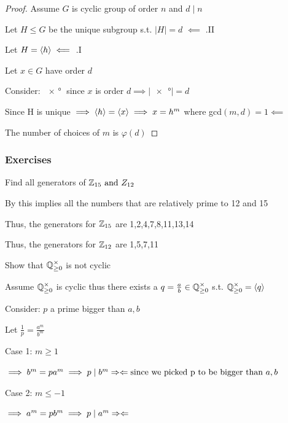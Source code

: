 
\begin{proof}
    Assume $G$ is cyclic group of order $n$ and $d\mid n$

    Let $H\leq G$ be the unique subgroup s.t. $|H|=d$
    $\impliedby$ .II

    Let $H=\left\langle h \right\rangle \impliedby$ .I

    Let $x\in G$ have order $d$
    
    Consider: $\ang{x}$ since $x$ is order $d \implies |\ang{x}|=d$

    Since H is unique $\implies \left\langle h \right\rangle=\left\langle x \right\rangle \implies x=h^m$ where gcd$(m,d)=1 \impliedby$ 

    The number of choices of $m$ is $\varphi(d)$
\end{proof}

\newpage
\subsubsection{Exercises}
\begin{example}
    Find all generators of $\mathbb{Z}_{15} \text{ and } Z_{12}$

    By  this implies all the numbers that are relatively prime to 12 and 15

    Thus, the generators for $\mathbb{Z}_{15}$ are 1,2,4,7,8,11,13,14

    Thus, the generators for $\mathbb{Z}_{12}$ are 1,5,7,11
    
\end{example}

\begin{example}
    Show that $\mathbb{Q}^\times_{\geq0}$ is not cyclic

    Assume $\mathbb{Q}^\times_{\geq0}$ is cyclic thus there exists
    a $q=\frac{a}{b}\in\mathbb{Q}^\times_{\geq0}$ s.t. $\mathbb{Q}^\times_{\geq0}=\left\langle q \right\rangle$

    Consider: $p$ a prime bigger than $a,b$

    Let $\frac{1}{p}=\frac{a^m}{b^m}$

    Case 1: $m \geq 1$

    $\implies b^m=pa^m \implies p \mid b^m \Rightarrow \Leftarrow \text{since we picked p to be bigger than } a,b$

    Case 2: $m \leq -1$
    
    $\implies a^m=pb^m \implies p \mid a^m \Rightarrow \Leftarrow$
\end{example}